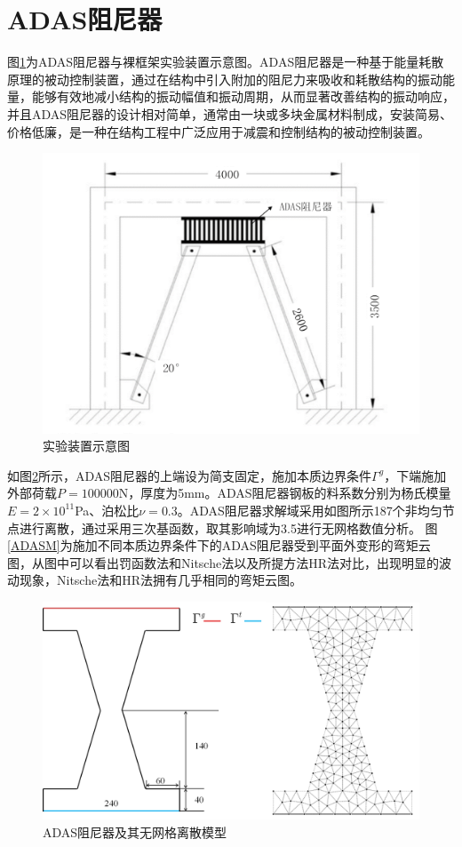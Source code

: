 \section{ADAS阻尼器}
图\ref{ADAS1}为ADAS阻尼器与裸框架实验装置示意图。ADAS阻尼器是一种基于能量耗散原理的被动控制装置，通过在结构中引入附加的阻尼力来吸收和耗散结构的振动能量，能够有效地减小结构的振动幅值和振动周期，从而显著改善结构的振动响应，
并且ADAS阻尼器的设计相对简单，通常由一块或多块金属材料制成，安装简易、价格低廉，是一种在结构工程中广泛应用于减震和控制结构的被动控制装置。
\begin{figure}[H]
    \centering
    \includegraphics[scale=0.6]{figure/DAMPER/ADAS/1.png}
    \caption{实验装置示意图\cite{basu2016}}\label{ADAS1}
\end{figure}
如图\ref{ADASmsh}所示，ADAS阻尼器的上端设为简支固定，施加本质边界条件$\Gamma^g$，下端施加外部荷载$P=100000$N，厚度为5mm。ADAS阻尼器钢板的料系数分别为杨氏模量$E=2\times 10^{11}$Pa、泊松比$\nu=0.3$。ADAS阻尼器求解域采用如图所示187个非均匀节点进行离散，通过采用三次基函数，取其影响域为3.5进行无网格数值分析。
图\ref{ADASM}为施加不同本质边界条件下的ADAS阻尼器受到平面外变形的弯矩云图，从图中可以看出罚函数法和Nitsche法以及所提方法HR法对比，出现明显的波动现象，Nitsche法和HR法拥有几乎相同的弯矩云图。
\newpage
\begin{figure}[H]
    \centering
    \includegraphics[scale=0.45]{figure/DAMPER/ADAS/ADAS damper_msh.png}
    \caption{ADAS阻尼器及其无网格离散模型}\label{ADASmsh}
\end{figure}
